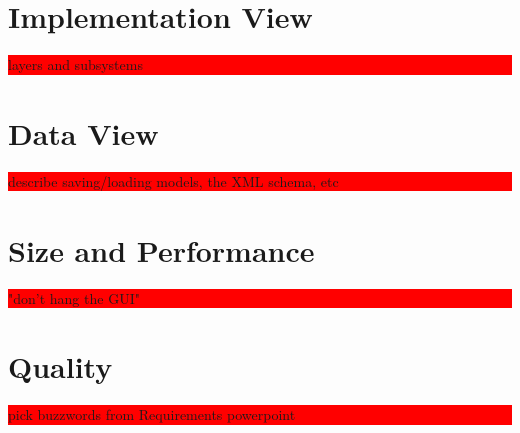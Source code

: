 \documentclass{article}
\newcommand{\todo}[1]{\colorbox{red}{\begin{minipage}{\textwidth}{#1}\end{minipage}}}
\begin{document}
\section{Implementation View}
\todo{layers and subsystems}

\section{Data View}
\todo{describe saving/loading models, the XML schema, etc}

\section{Size and Performance}
\todo{"don't hang the GUI"}

\section{Quality}
\todo{pick buzzwords from Requirements powerpoint}
\end{document}
